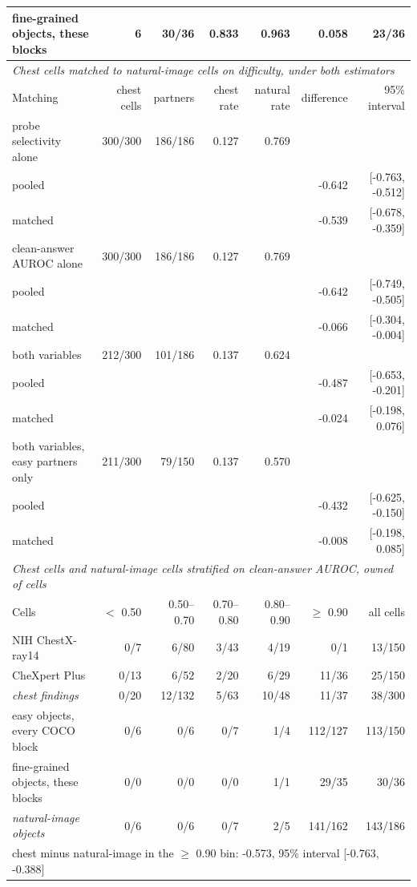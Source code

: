 \begin{table}[htbp]
\begin{tabular}{lrrrrrr}
fine-grained objects, these blocks & 6 & 30/36 & 0.833 & 0.963 & 0.058 & 23/36 \\
\midrule
\multicolumn{7}{l}{\textit{Chest cells matched to natural-image cells on difficulty, under both estimators}} \\
Matching & chest cells & partners & chest rate & natural rate & difference & 95\% interval \\
\midrule
probe selectivity alone & 300/300 & 186/186 & 0.127 & 0.769 &  &  \\
\quad pooled &  &  &  &  & -0.642 & [-0.763, -0.512] \\
\quad matched &  &  &  &  & -0.539 & [-0.678, -0.359] \\
clean-answer AUROC alone & 300/300 & 186/186 & 0.127 & 0.769 &  &  \\
\quad pooled &  &  &  &  & -0.642 & [-0.749, -0.505] \\
\quad matched &  &  &  &  & -0.066 & [-0.304, -0.004] \\
both variables & 212/300 & 101/186 & 0.137 & 0.624 &  &  \\
\quad pooled &  &  &  &  & -0.487 & [-0.653, -0.201] \\
\quad matched &  &  &  &  & -0.024 & [-0.198, 0.076] \\
both variables, easy partners only & 211/300 & 79/150 & 0.137 & 0.570 &  &  \\
\quad pooled &  &  &  &  & -0.432 & [-0.625, -0.150] \\
\quad matched &  &  &  &  & -0.008 & [-0.198, 0.085] \\
\midrule
\multicolumn{7}{l}{\textit{Chest cells and natural-image cells stratified on clean-answer AUROC, owned of cells}} \\
Cells & $<$ 0.50 & 0.50--0.70 & 0.70--0.80 & 0.80--0.90 & $\geq$ 0.90 & all cells \\
\midrule
NIH ChestX-ray14 & 0/7 & 6/80 & 3/43 & 4/19 & 0/1 & 13/150 \\
CheXpert Plus & 0/13 & 6/52 & 2/20 & 6/29 & 11/36 & 25/150 \\
\textit{chest findings} & 0/20 & 12/132 & 5/63 & 10/48 & 11/37 & 38/300 \\
easy objects, every COCO block & 0/6 & 0/6 & 0/7 & 1/4 & 112/127 & 113/150 \\
fine-grained objects, these blocks & 0/0 & 0/0 & 0/0 & 1/1 & 29/35 & 30/36 \\
\textit{natural-image objects} & 0/6 & 0/6 & 0/7 & 2/5 & 141/162 & 143/186 \\
\multicolumn{7}{l}{\quad chest minus natural-image in the $\geq$ 0.90 bin: -0.573, 95\% interval [-0.763, -0.388]} \\
\bottomrule
\end{tabular}
\end{table}
